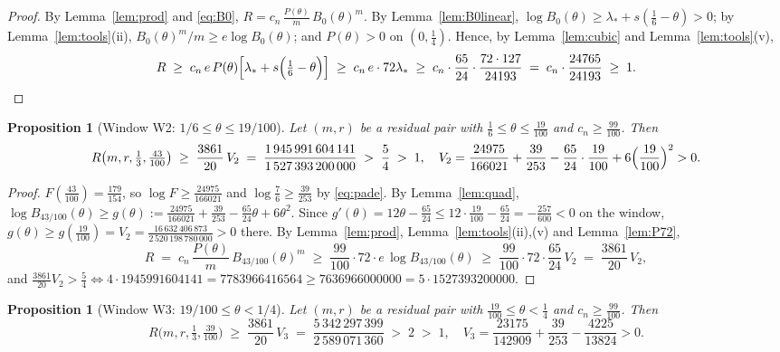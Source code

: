 \documentclass[11pt]{article}
\newtheorem{proposition}[theorem]{Proposition}
\theoremstyle{remark}
\theoremstyle{plain}
\theoremstyle{plain}
\begin{document}
\begin{proof}
By Lemma~\ref{lem:prod} and \eqref{eq:B0}, $R=c_n\,\frac{P(\theta)}m\,B_0(\theta)^m$.  By Lemma~\ref{lem:B0linear}, $\log B_0(\theta)\ge\lambda_*+s(\tfrac16-\theta)>0$; by Lemma~\ref{lem:tools}(ii), $B_0(\theta)^m/m\ge e\log B_0(\theta)$; and $P(\theta)>0$ on $(0,\tfrac14)$.  Hence, by Lemma~\ref{lem:cubic} and Lemma~\ref{lem:tools}(v),
\[
        R\;\ge\;c_n\,e\,P(\theta)\Bigl[\lambda_*+s\Bigl(\tfrac16-\theta\Bigr)\Bigr]
        \;\ge\;c_n\,e\cdot72\lambda_*
        \;\ge\;c_n\cdot\frac{65}{24}\cdot\frac{72\cdot127}{24193}
        \;=\;c_n\cdot\frac{24765}{24193}\;\ge\;1 . \qedhere
\]
\end{proof}

\begin{proposition}[Window W2: $1/6\le\theta\le19/100$]\label{prop:W2}
Let $(m,r)$ be a residual pair with $\tfrac16\le\theta\le\tfrac{19}{100}$ and $c_n\ge\tfrac{99}{100}$.  Then
\[
        R\bigl(m,r,\tfrac13,\tfrac{43}{100}\bigr)
        \;\ge\;\frac{3861}{20}\,V_2\;=\;
        \frac{1\,945\,991\,604\,141}{1\,527\,393\,200\,000}\;>\;\frac54\;>\;1,
        \quad
        V_2=\frac{24975}{166021}+\frac{39}{253}
        -\frac{65}{24}\cdot\frac{19}{100}+6\Bigl(\frac{19}{100}\Bigr)^2>0 .
\]
\end{proposition}

\begin{proof}
$F(\tfrac{43}{100})=\tfrac{179}{154}$, so $\log F\ge\tfrac{24975}{166021}$ and $\log\tfrac76\ge\tfrac{39}{253}$ by \eqref{eq:pade}.  By Lemma~\ref{lem:quad},
$\log B_{43/100}(\theta)\ge g(\theta):=\tfrac{24975}{166021}+\tfrac{39}{253}-\tfrac{65}{24}\theta+6\theta^2$.
Since $g'(\theta)=12\theta-\tfrac{65}{24}\le12\cdot\tfrac{19}{100}-\tfrac{65}{24}=-\tfrac{257}{600}<0$ on the window, $g(\theta)\ge g(\tfrac{19}{100})=V_2=\tfrac{16\,632\,406\,873}{2\,520\,198\,780\,000}>0$ there.  By Lemma~\ref{lem:prod}, Lemma~\ref{lem:tools}(ii),(v) and Lemma~\ref{lem:P72},
\[
        R\;=\;c_n\,\frac{P(\theta)}m\,B_{43/100}(\theta)^m
        \;\ge\;\frac{99}{100}\cdot72\cdot e\,\log B_{43/100}(\theta)
        \;\ge\;\frac{99}{100}\cdot72\cdot\frac{65}{24}\,V_2
        \;=\;\frac{3861}{20}\,V_2 ,
\]
and $\tfrac{3861}{20}V_2>\tfrac54\iff4\cdot1945991604141=7783966416564\ge7636966000000=5\cdot1527393200000$.
\end{proof}

\begin{proposition}[Window W3: $19/100\le\theta<1/4$]\label{prop:W3}
Let $(m,r)$ be a residual pair with $\tfrac{19}{100}\le\theta<\tfrac14$ and $c_n\ge\tfrac{99}{100}$.  Then
\[
        R\bigl(m,r,\tfrac13,\tfrac{39}{100}\bigr)
        \;\ge\;\frac{3861}{20}\,V_3\;=\;
        \frac{5\,342\,297\,399}{2\,589\,071\,360}\;>\;2\;>\;1,
        \quad
        V_3=\frac{23175}{142909}+\frac{39}{253}-\frac{4225}{13824}>0 .
\]
\end{proposition}
\end{document}
